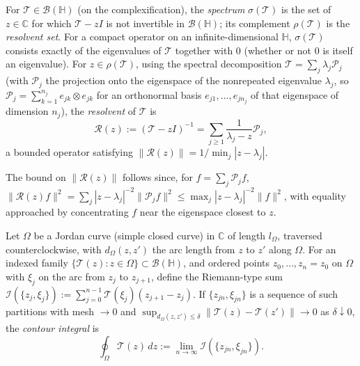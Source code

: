 \begin{definition}
\label{def:spectrum_resolvent}
For $\mathcal{T}\in\mathcal{B}(\mathbb{H})$ (on the complexification), the
\emph{spectrum} $\sigma(\mathcal{T})$ is the set of $z\in\mathbb{C}$ for
which $\mathcal{T}-zI$ is not invertible in $\mathcal{B}(\mathbb{H})$; its
complement $\rho(\mathcal{T})$ is the \emph{resolvent set}. For a compact
operator on an infinite-dimensional $\mathbb{H}$, $\sigma(\mathcal{T})$
consists exactly of the eigenvalues of $\mathcal{T}$ together with $0$
(whether or not $0$ is itself an eigenvalue). For $z\in\rho(\mathcal{T})$,
using the spectral decomposition $\mathcal{T}=\sum_j\lambda_j\mathcal{P}_j$
(with $\mathcal{P}_j$ the projection onto the eigenspace of the
nonrepeated eigenvalue $\lambda_j$, so $\mathcal{P}_j = \sum_{k=1}^{n_j}
e_{jk}\otimes e_{jk}$ for an orthonormal basis $e_{j1},\dots,e_{jn_j}$ of
that eigenspace of dimension $n_j$), the \emph{resolvent} of $\mathcal{T}$
is
\begin{equation}
\mathcal{R}(z) := (\mathcal{T}-zI)^{-1} = \sum_{j\geq 1}\frac{1}{\lambda_j
-z}\mathcal{P}_j,
\label{eq:resolvent}
\end{equation}
a bounded operator satisfying $\|\mathcal{R}(z)\| = 1/\min_j|z-\lambda_j|$.
\end{definition}

The bound on $\|\mathcal{R}(z)\|$ follows since, for
$f=\sum_j\mathcal{P}_jf$, $\|\mathcal{R}(z)f\|^2 = \sum_j|z-\lambda_j|^{-2}
\|\mathcal{P}_jf\|^2 \leq \max_j|z-\lambda_j|^{-2}\|f\|^2$, with equality
approached by concentrating $f$ near the eigenspace closest to $z$.

\begin{definition}
\label{def:contour_integral}
Let $\Omega$ be a Jordan curve (simple closed curve) in $\mathbb{C}$ of
length $l_\Omega$, traversed counterclockwise, with $d_\Omega(z,z')$ the
arc length from $z$ to $z'$ along $\Omega$. For an indexed family
$\{\mathcal{T}(z):z\in\Omega\}\subset\mathcal{B}(\mathbb{H})$, and ordered
points $z_0,\dots,z_n=z_0$ on $\Omega$ with $\xi_j$ on the arc from $z_j$
to $z_{j+1}$, define the Riemann-type sum $\mathcal{I}(\{z_j,\xi_j\}) :=
\sum_{j=0}^{n-1}\mathcal{T}(\xi_j)(z_{j+1}-z_j)$. If $\{z_{jn},\xi_{jn}\}$
is a sequence of such partitions with mesh $\to 0$ and
$\sup_{d_\Omega(z,z')\leq\delta}\|\mathcal{T}(z)-\mathcal{T}(z')\|\to 0$ as
$\delta\downarrow 0$, the \emph{contour integral} is
\begin{equation}
\oint_\Omega\mathcal{T}(z)\,dz := \lim_{n\to\infty}\mathcal{I}(\{z_{jn},
\xi_{jn}\}).
\label{eq:contour_integral}
\end{equation}
\end{definition}

